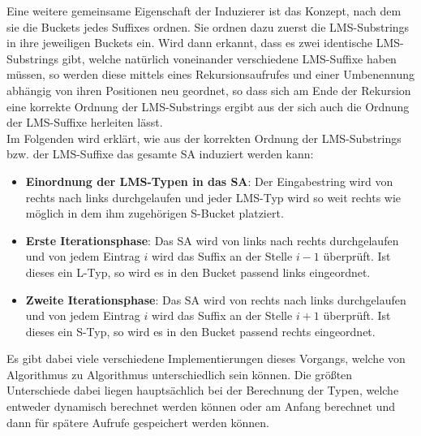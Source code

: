 Eine weitere gemeinsame Eigenschaft der Induzierer ist das Konzept, nach dem sie die Buckets jedes Suffixes ordnen. Sie ordnen dazu zuerst die LMS-Substrings in ihre jeweiligen Buckets ein. Wird dann erkannt, dass es zwei identische LMS-Substrings gibt, welche natürlich voneinander verschiedene LMS-Suffixe haben müssen, so werden diese mittels eines Rekursionsaufrufes und einer Umbenennung abhängig von ihren Positionen neu geordnet, so dass sich am Ende der Rekursion eine korrekte Ordnung der LMS-Substrings ergibt aus der sich auch die Ordnung der LMS-Suffixe herleiten lässt. \\
Im Folgenden wird erklärt, wie aus der korrekten Ordnung der LMS-Substrings bzw. der LMS-Suffixe das gesamte SA induziert werden kann:
\begin{itemize}
\item \textbf{Einordnung der LMS-Typen in das SA}: Der Eingabestring wird von rechts nach links durchgelaufen und jeder LMS-Typ wird so weit rechts wie möglich in dem ihm zugehörigen S-Bucket platziert.
\item \textbf{Erste Iterationsphase}: Das SA wird von links nach rechts durchgelaufen und von jedem Eintrag $i$ wird das Suffix an der Stelle $i-1$ überprüft. Ist dieses ein L-Typ, so wird es in den Bucket passend links eingeordnet.
\item \textbf{Zweite Iterationsphase}: Das SA wird von rechts nach links durchgelaufen und von jedem Eintrag $i$ wird das Suffix an der Stelle $i+1$ überprüft. Ist dieses ein S-Typ, so wird es in den Bucket passend rechts eingeordnet.
\end{itemize}

Es gibt dabei viele verschiedene Implementierungen dieses Vorgangs, welche von Algorithmus zu Algorithmus unterschiedlich sein können. Die größten Unterschiede dabei liegen hauptsächlich bei der Berechnung der Typen, welche entweder dynamisch berechnet werden können oder am Anfang berechnet und dann für spätere Aufrufe gespeichert werden können.
